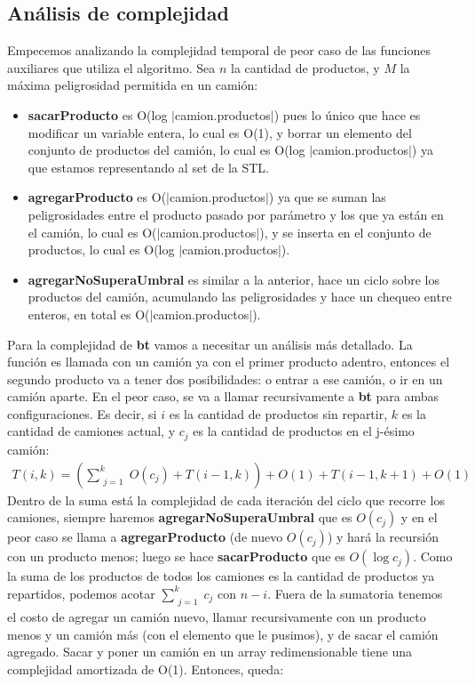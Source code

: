 \subsection{An\'alisis de complejidad}
Empecemos analizando la complejidad temporal de peor caso de las funciones auxiliares que utiliza el algoritmo. Sea $n$ la cantidad de productos, y $M$ la máxima peligrosidad permitida en un camión:
\begin{itemize}
	\item \textbf{sacarProducto} es O(log $|$camion.productos$|$) pues lo único que hace es modificar un variable entera, lo cual es O(1), y borrar un elemento del conjunto de productos del camión, lo cual es O(log $|$camion.productos$|$) ya que estamos representando al set de la STL.
	\item \textbf{agregarProducto} es O($|$camion.productos$|$) ya que se suman las peligrosidades entre el producto pasado por parámetro y los que ya están en el camión, lo cual es O($|$camion.productos$|$), y se inserta en el conjunto de productos, lo cual es O(log $|$camion.productos$|$).
	\item \textbf{agregarNoSuperaUmbral} es similar a la anterior, hace un ciclo sobre los productos del camión, acumulando las peligrosidades y hace un chequeo entre enteros, en total es O($|$camion.productos$|$).
\end{itemize}
Para la complejidad de \textbf{bt} vamos a necesitar un análisis más detallado. La función es llamada con un camión ya con el primer producto adentro, entonces el segundo producto va a tener dos posibilidades: o entrar a ese camión, o ir en un camión aparte. En el peor caso, se va a llamar recursivamente a \textbf{bt} para ambas configuraciones. Es decir, si $i$ es la cantidad de productos sin repartir,  $k$ es la cantidad de camiones actual, y $c_j$ es la cantidad de productos en el j-ésimo camión:
\begin{align*}
T(i,k) = \left(\sum\limits_{\substack{j = 1}}^k O(c_j) + T(i-1,k)\right) + O(1) + T(i-1,k+1) + O(1)
\end{align*}
Dentro de la suma está la complejidad de cada iteración del ciclo que recorre los camiones, siempre haremos \textbf{agregarNoSuperaUmbral} que es $O(c_j)$ y en el peor caso se llama a \textbf{agregarProducto} (de nuevo $O(c_j)$) y hará la recursión con un producto menos; luego se hace \textbf{sacarProducto} que es $O(\log c_j)$. Como la suma de los productos de todos los camiones es la cantidad de productos ya repartidos, podemos acotar $\sum\limits_{\substack{j = 1}}^k c_j$ con $n-i$. Fuera de la sumatoria tenemos el costo de agregar un camión nuevo, llamar recursivamente con un producto menos y un camión más (con el elemento que le pusimos), y de sacar el camión agregado. Sacar y poner un camión en un array redimensionable tiene una complejidad amortizada de O(1). Entonces, queda:
